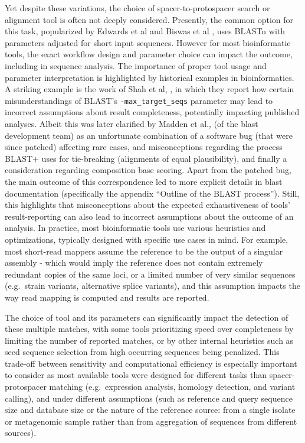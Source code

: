 \documentclass[
]{article}
\begin{document}
Yet despite these variations, the choice of spacer-to-protospacer search
or alignment tool is often not deeply considered. Presently, the common
option for this task, popularized by Edwards et al and Biswas et al
\autocite{Edwards2015_phage_host,Biswas2013}, uses BLASTn
\autocite{Altschul1990_blast} with parameters adjusted for short input
sequences. However for most bioinformatic tools, the exact workflow
design and parameter choice can impact the outcome, including in
sequence analysis. The importance of proper tool usage and parameter
interpretation is highlighted by historical examples in bioinformatics.
A striking example is the work of Shah et al, \textcite{Shah2018}, in
which they report how certain misunderstandings of BLAST's
\texttt{-max\_target\_seqs} parameter may lead to incorrect assumptions
about result completeness, potentially impacting published analyses.
Albeit this was later clarified by Madden et al., \autocite{Madden2018}
(of the blast development team) as an unfortunate combination of a
software bug (that were since patched) affecting rare cases, and
misconceptions regarding the process BLAST+ uses for tie-breaking
(alignments of equal plausibility), and finally a consideration
regarding composition base scoring. Apart from the patched bug, the main
outcome of this correspondence led to more explicit details in blast
documentation (specifically the appendix ``Outline of the BLAST
process''). Still, this highlights that misconceptions about the
expected exhaustiveness of tools' result-reporting can also lead to
incorrect assumptions about the outcome of an analysis. In practice,
most bioinformatic tools use various heuristics and optimizations,
typically designed with specific use cases in mind. For example, most
short-read mappers assume the reference to be the output of a singular
assembly - which would imply the reference does not contain extremely
redundant copies of the same loci, or a limited number of very similar
sequences (e.g.~strain variants, alternative splice variants), and this
assumption impacts the way read mapping is computed and results are
reported.

The choice of tool and its parameters can significantly impact the
detection of these multiple matches, with some tools prioritizing speed
over completeness by limiting the number of reported matches, or by
other internal heuristics such as seed sequence selection from high
occurring sequences being penalized. This trade-off between sensitivity
and computational efficiency is especially important to consider as most
available tools were designed for different tasks than
spacer-protospacer matching (e.g.~expression analysis, homology
detection, and variant calling), and under different assumptions (such
as reference and query sequence size and database size or the nature of
the reference source: from a single isolate or metagenomic sample rather
than from aggregation of sequences from different sources).
\end{document}
